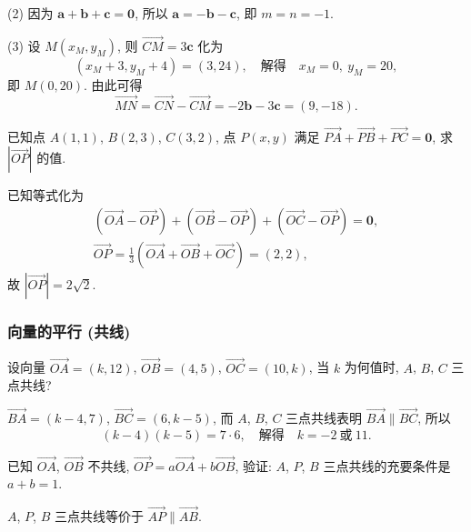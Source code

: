     (2) 因为 $\bm{a}+\bm{b}+\bm{c}= \bm{0}$, 所以 $\bm{a}= -\bm{b}-\bm{c}$, 即 $m=n=-1$.

    (3) 设 $M(x_M,y_M)$, 则 $\overrightarrow{CM}=3\bm{c}$ 化为
    \[(x_M+3,y_M+4)= (3,24),\quad\text{解得}\quad
        x_M= 0,\ y_M= 20,\]
    即 $M(0,20)$. 由此可得
    \[\overrightarrow{MN}
        = \overrightarrow{CN}- \overrightarrow{CM}
        = -2\bm{b}- 3\bm{c}= (9,-18).\]
\endsolution

\lianxi
\begin{exercise}[s]
    已知点 $A(1,1)$, $B(2,3)$, $C(3,2)$, 点 $P(x,y)$ 满足 
    $\overrightarrow{PA}+ \overrightarrow{PB}+ \overrightarrow{PC}=\bm{0}$, 求 $|\overrightarrow{OP}|$ 的值.
\end{exercise}
\beginsolution
    已知等式化为
    \[\begin{gathered}
        (\overrightarrow{OA}- \overrightarrow{OP})
        + (\overrightarrow{OB}- \overrightarrow{OP})
        + (\overrightarrow{OC}- \overrightarrow{OP})= \bm{0},\\
        \overrightarrow{OP}
        = \frac13(\overrightarrow{OA}+ \overrightarrow{OB}+ \overrightarrow{OC})
        = (2,2),
    \end{gathered}\]
    故 $|\overrightarrow{OP}|= 2\sqrt2$.
\endsolution

\subsubsection{向量的平行 (共线)}
\begin{example}
    设向量 $\overrightarrow{OA}=(k,12)$, $\overrightarrow{OB}=(4,5)$, 
    $\overrightarrow{OC}=(10,k)$, 当 $k$ 为何值时, $A$, $B$, $C$ 三点共线?
\end{example}
\beginsolution
    $\overrightarrow{BA}= (k-4,7)$, $\overrightarrow{BC}= (6,k-5)$, 而 $A$, $B$, $C$ 三点共线表明 $\overrightarrow{BA}\parallel \overrightarrow{BC}$, 所以
    \[(k-4)(k-5)= 7\cdot 6,\quad\text{解得}\quad k=-2\ \text{或}\ 11.\]
\endsolution

\lianxi
\begin{exercise}[s]
    已知 $\overrightarrow{OA}$, $\overrightarrow{OB}$ 不共线, 
    $\overrightarrow{OP}= a\overrightarrow{OA}+ b\overrightarrow{OB}$,
    验证: $A$, $P$, $B$ 三点共线的充要条件是 $a+b=1$.
\end{exercise}
\beginsolution
    $A$, $P$, $B$ 三点共线等价于 $\overrightarrow{AP}\parallel \overrightarrow{AB}$.

